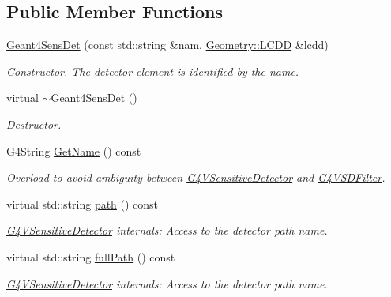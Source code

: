 \subsection*{Public Member Functions}
\begin{DoxyCompactItemize}
\item 
\hyperlink{class_d_d4hep_1_1_simulation_1_1_geant4_sens_det_a3e1c226eea8d6027fabf211df59fa4c4}{Geant4\+Sens\+Det} (const std\+::string \&nam, \hyperlink{class_d_d4hep_1_1_geometry_1_1_l_c_d_d}{Geometry\+::\+L\+C\+DD} \&lcdd)
\begin{DoxyCompactList}\small\item\em Constructor. The detector element is identified by the name. \end{DoxyCompactList}\item 
virtual \hyperlink{class_d_d4hep_1_1_simulation_1_1_geant4_sens_det_a29286fa61cf355cd3572e73bf5e77204}{$\sim$\+Geant4\+Sens\+Det} ()
\begin{DoxyCompactList}\small\item\em Destructor. \end{DoxyCompactList}\item 
G4\+String \hyperlink{class_d_d4hep_1_1_simulation_1_1_geant4_sens_det_a6ad5e5a5bf83eea0191768d090e63590}{Get\+Name} () const
\begin{DoxyCompactList}\small\item\em Overload to avoid ambiguity between \hyperlink{class_g4_v_sensitive_detector}{G4\+V\+Sensitive\+Detector} and \hyperlink{class_g4_v_s_d_filter}{G4\+V\+S\+D\+Filter}. \end{DoxyCompactList}\item 
virtual std\+::string \hyperlink{class_d_d4hep_1_1_simulation_1_1_geant4_sens_det_af199492ba6d537d22ae3fcf5e6dddac3}{path} () const
\begin{DoxyCompactList}\small\item\em \hyperlink{class_g4_v_sensitive_detector}{G4\+V\+Sensitive\+Detector} internals\+: Access to the detector path name. \end{DoxyCompactList}\item 
virtual std\+::string \hyperlink{class_d_d4hep_1_1_simulation_1_1_geant4_sens_det_a0a5229cabfdd17f1f370954c9cf9130c}{full\+Path} () const
\begin{DoxyCompactList}\small\item\em \hyperlink{class_g4_v_sensitive_detector}{G4\+V\+Sensitive\+Detector} internals\+: Access to the detector path name. \end{DoxyCompactList}\item 

\end{DoxyCompactItemize}
